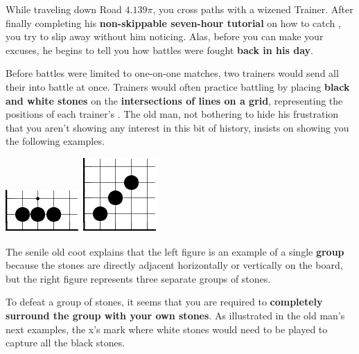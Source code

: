 

While traveling down Road \(4.139\pi\),
you cross paths with a wizened \mappMobidot{} Trainer. After finally
completing his
\textbf{non-skippable seven-hour tutorial} on how to catch \mappMobimon{},
you try to slip away without him noticing. Alas, before you can make your
excuses, he begins to tell you how \mappMobidot{} battles were fought
\textbf{back in his day}.

Before \mappMobimon{} battles were limited to one-on-one matches,
two trainers would send all their \mappMobidot{} into battle at once. Trainers
would often practice battling by placing \textbf{black and white stones}
on the \textbf{intersections of lines on a grid}, representing the positions
of each trainer's \mappMobimon{}. The old man,
not bothering to hide his frustration that you aren't showing any
interest in this bit of history, insists on showing you the following examples.

\begin{center}
  \includegraphics{gogetem/assets/explanation1-crop}
  \includegraphics{gogetem/assets/explanation2-crop}
\end{center}

The senile old coot explains that the left figure is an example of a single
\textbf{group} because the stones are directly adjacent horizontally
or vertically on the board, but the right figure represents
three separate groups of stones.

To defeat a group of stones, it seems that you are required to
\textbf{completely surround the group with your own stones}. As illustrated
in the old man's next examples, the x's mark where white stones would need to be
played to capture all the black stones.

